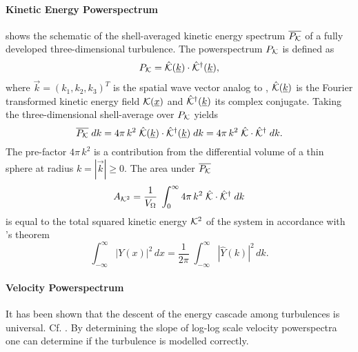 \paragraph{Kinetic Energy Powerspectrum}
\newcommand{\pekin}{P_{\ekin}}

 shows the schematic of the shell-averaged
kinetic energy spectrum $\overline{\pekin}$ of a fully developed three-dimensional
turbulence. The powerspectrum $\pekin$ is defined as
\begin{equation}
    \pekin = \hat{\ekin}(\vec{k}) \cdot \hat{\ekin}^{\dagger}(\vec{k}),
\end{equation}
where $\vec{k} = (k_1,k_2,k_3)^T$  is the spatial wave vector analog to
, $\hat{\mathcal{K}}(\underline{k})$ is the Fourier transformed kinetic
energy field $\mathcal{K}(\underline{x})$ and $\hat{\mathcal{K}}^{\dagger}(\underline{k})$ its complex
conjugate.  Taking the three-dimensional shell-average over $\pekin$
yields
\begin{equation}
\label{eqn:pws-ekin}
    \overline{\pekin} \; dk = 4\pi\,k^2 \; \hat{\ekin}(\vec{k}) \cdot \hat{\ekin}^{\dagger}(\vec{k}) \; dk
        = 4\pi\,k^2 \; \hat{\ekin} \cdot \hat{\ekin}^{\dagger} \; dk
.
\end{equation}
The pre-factor $4 \pi\,k^2$ is a contribution from the differential volume of a
thin sphere at radius $k = |\vec{k}| \ge 0$.  The area under
$\overline{\pekin}$
\begin{equation}
    A_{\mathcal{K}^2} = \frac{1}{V_{\Omega}} \; \int_0^\infty 4\pi\,k^2 \; \hat{\mathcal{K}} \cdot \hat{\mathcal{K}}^{\dagger} \; dk
\end{equation}
is equal to the total squared kinetic energy $\mathcal{K}^2$ of the system in
accordance with 's theorem
\begin{equation}
    \int_{-\infty}^{\infty} |Y(x)|^2 \, dx = \frac{1}{2\pi} \; \int_{-\infty}^{\infty} |\hat{Y}(k)|^2 \,dk.
\end{equation}

\paragraph{Velocity Powerspectrum}
\newcommand{\pvels}{P_{\vels}}
\newcommand{\pmvels}{P_{m\vels}}
It has been shown that the descent of the energy cascade among turbulences is
universal. Cf. \cite{federrath2013universality,she1994universal,boldyrev2002scaling,kitsionas2009algorithmic}.
By determining the slope of log-log scale velocity powerspectra one can
determine if the turbulence is modelled correctly.


